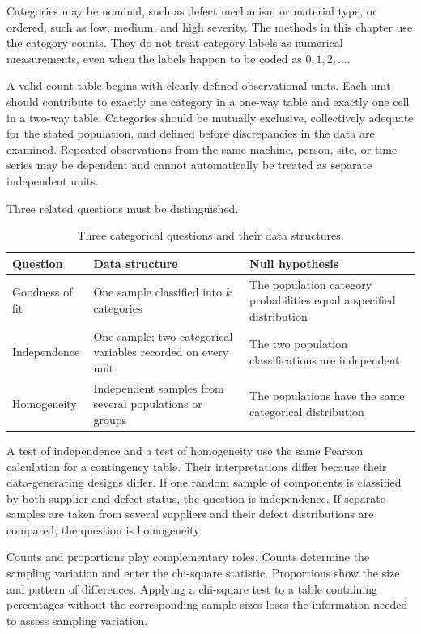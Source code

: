 Categories may be nominal, such as defect mechanism or material type, or ordered, such as low, medium, and high severity. The methods in this chapter use the category counts. They do not treat category labels as numerical measurements, even when the labels happen to be coded as $0,1,2,\ldots$.

A valid count table begins with clearly defined observational units. Each unit should contribute to exactly one category in a one-way table and exactly one cell in a two-way table. Categories should be mutually exclusive, collectively adequate for the stated population, and defined before discrepancies in the data are examined. Repeated observations from the same machine, person, site, or time series may be dependent and cannot automatically be treated as separate independent units.

Three related questions must be distinguished.

\begin{table}[htbp]
\centering
\caption{Three categorical questions and their data structures.}
\label{tab:categorical-questions}
\begin{tabularx}{\textwidth}{@{}p{}>{\raggedright\arraybackslash}X>{\raggedright\arraybackslash}X@{}}
\toprule
Question & Data structure & Null hypothesis \\
\midrule
Goodness of fit & One sample classified into $k$ categories & The population category probabilities equal a specified distribution \\
Independence & One sample; two categorical variables recorded on every unit & The two population classifications are independent \\
Homogeneity & Independent samples from several populations or groups & The populations have the same categorical distribution \\
\bottomrule
\end{tabularx}
\end{table}

A test of independence and a test of homogeneity use the same Pearson calculation for a contingency table. Their interpretations differ because their data-generating designs differ. If one random sample of components is classified by both supplier and defect status, the question is independence. If separate samples are taken from several suppliers and their defect distributions are compared, the question is homogeneity.

Counts and proportions play complementary roles. Counts determine the sampling variation and enter the chi-square statistic. Proportions show the size and pattern of differences. Applying a chi-square test to a table containing percentages without the corresponding sample sizes loses the information needed to assess sampling variation.

